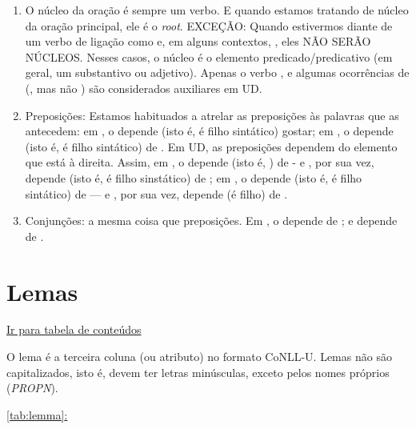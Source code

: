 \documentclass[output=paper,colorlinks,citecolor=brown]{langscibook}
\newcommand*{\fullref}[1]{\hyperref[{#1}]{\autoref*{#1}: \nameref*{#1}}} %
\begin{document}
	\begin{enumerate}
		\item O núcleo da oração é sempre um verbo. E quando estamos tratando de núcleo da oração principal, ele é o \emph{root}. EXCEÇÃO: Quando estivermos diante de um verbo de ligação como  e, em alguns contextos, , eles NÃO SERÃO NÚCLEOS. Nesses casos, o núcleo é o elemento predicado/predicativo (em geral, um substantivo ou adjetivo). Apenas o verbo , e algumas ocorrências de  (, mas não ) são considerados auxiliares em UD. 

		\item Preposições: Estamos habituados a atrelar as preposições às palavras que as antecedem: em , o  depende (isto é, é filho sintático) gostar; em , o  depende (isto é, é filho sintático) de . Em UD, as preposições dependem do elemento que está à direita. Assim, em , o  depende (isto é, ) de  - e , por sua vez, depende (isto é, é filho sinstático) de ; em , o  depende (isto é, é filho sintático) de  — e , por sua vez, depende (é filho) de . 

		\item Conjunções: a mesma coisa que preposições. Em , o  depende de ; e  depende de .
	\end{enumerate}


\chapter{Lemas}\label{sec:lemas}

	\hyperlink{toc}{Ir para tabela de conteúdos\\}

	O lema é a terceira coluna (ou atributo) no formato CoNLL-U. Lemas não são capitalizados, isto é, devem ter letras minúsculas, exceto pelos nomes próprios (\emph{PROPN}).

	\fullref{tab:lemma}
\end{document}
